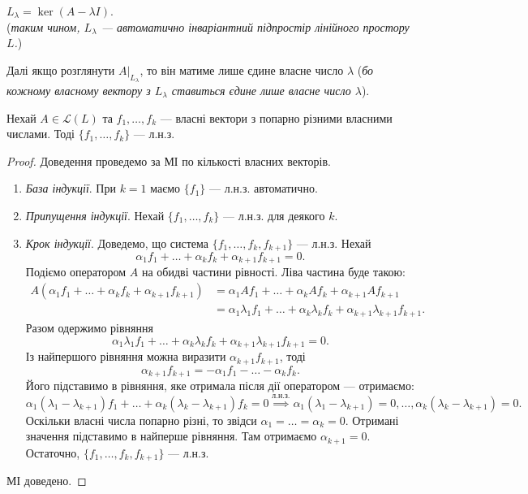 \documentclass{math_library}
\begin{document}
\begin{corollary}
\label{eigenspace_is_subspace}
$L_\lambda = \ker(A-\lambda I)$.\\
(\textit{таким чином, $L_{\lambda}$ --- автоматично інваріантний підпростір лінійного простору $L$.})
\end{corollary}

\begin{remark}
Далі якщо розглянути $A|_{L_{\lambda}}$, то він матиме лише єдине власне число $\lambda$ (\textit{бо кожному власному вектору з $L_{\lambda}$ ставиться єдине лише власне число $\lambda$}).
\end{remark}

\begin{proposition}
Нехай $A \in \mathcal{L}(L)$ та $f_1,\dots,f_k$ --- власні вектори з попарно різними власними числами. Тоді $\{f_1,\dots,f_k\}$ --- л.н.з.
\end{proposition}

\begin{proof}
Доведення проведемо за МІ по кількості власних векторів.
\begin{enumerate}[nosep,wide=0pt,label={\Roman*.}]
\item \textit{База індукції}. При $k=1$ маємо $\{f_1\}$ --- л.н.з. автоматично.
\item \textit{Припущення індукції}. Нехай $\{f_1,\dots,f_k\}$ --- л.н.з. для деякого $k$.
\item \textit{Крок індукції}. Доведемо, що система $\{f_1,\dots,f_k, f_{k+1}\}$ --- л.н.з. Нехай
\[
\alpha_1 f_1 + \dots + \alpha_k f_k + \alpha_{k+1} f_{k+1} = 0.
\]
Подіємо оператором $A$ на обидві частини рівності. Ліва частина буде такою:
\begin{align*}
A(\alpha_1 f_1 + \dots + \alpha_k f_k + \alpha_{k+1} f_{k+1}) & = \alpha_1 Af_1 + \dots + \alpha_k Af_k + \alpha_{k+1} Af_{k+1} \\
& = \alpha_1 \lambda_1 f_1 + \dots + \alpha_k \lambda_k f_k + \alpha_{k+1} \lambda_{k+1} f_{k+1}.
\end{align*}
Разом одержимо рівняння
\[
\alpha_1 \lambda_1 f_1 + \dots + \alpha_k \lambda_k f_k + \alpha_{k+1} \lambda_{k+1} f_{k+1} = 0.
\]
Із найпершого рівняння можна виразити $\alpha_{k+1} f_{k+1}$, тоді
\[
\alpha_{k+1}f_{k+1} = -\alpha_1 f_1 - \dots - \alpha_k f_k.
\]
Його підставимо в рівняння, яке отримала після дії оператором --- отримаємо:
\[
\alpha_1 (\lambda_1 - \lambda_{k+1})f_1 + \dots + \alpha_k (\lambda_k - \lambda_{k+1})f_k = 0 \overset{\textrm{л.н.з.}}{\implies} \alpha_1(\lambda_1 - \lambda_{k+1})=0, \dots, \alpha_k(\lambda_k - \lambda_{k+1}) = 0.
\]
Оскільки власні числа попарно різні, то звідси $\alpha_1 = \dots = \alpha_k = 0$. Отримані значення підставимо в найперше рівняння. Там отримаємо $\alpha_{k+1} = 0$.\\
Остаточно, $\{f_1,\dots,f_k, f_{k+1}\}$ --- л.н.з.
\end{enumerate}
МІ доведено.
\end{proof}
\end{document}
